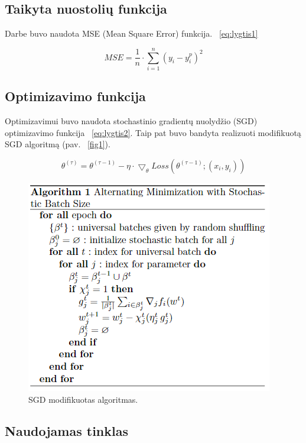 \documentclass[conference]{IEEEtran}
\begin{document}
\subsection{Taikyta nuostolių funkcija}

Darbe buvo naudota MSE (Mean Square Error) funkcija. ~\eqref{eq:lygtis1}

\begin{equation}
MSE = \frac{1}{n} \cdot \sum_{i=1}^{n} (y_{i} - y_{i}^{p})^{2}
\label{eq:lygtis1}
\end{equation}

\subsection{Optimizavimo funkcija}

Optimizavimui buvo naudota stochastinio gradientų nuolydžio
(SGD) optimizavimo funkcija ~\eqref{eq:lygtis2}. Taip pat buvo bandyta realizuoti modifikuotą SGD algoritmą (pav. ~\ref{fig1}).

\begin{equation}
\theta^{(\tau)} = \theta^{(\tau - 1)} - \eta \cdot \bigtriangledown_{\theta} Loss(\theta^{(\tau - 1)};(x_{i}, y_{i}))
\label{eq:lygtis2}
\end{equation}

\begin{figure}[!h] %
\centerline{\includegraphics[scale=0.4] {images/2.png}}
\caption{SGD modifikuotas algoritmas.}
\label{fig4}
\end{figure}

\subsection{Naudojamas tinklas}
\end{document}
